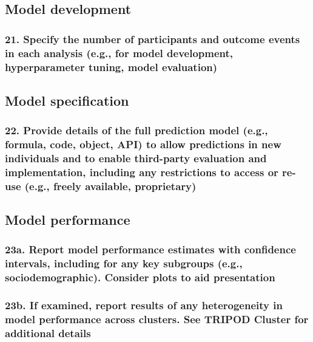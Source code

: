 \documentclass[
  letterpaper,
  DIV=11,
  numbers=noendperiod]{scrartcl}
\begin{document}
\subsection{Model development}\label{model-development}

\subsubsection{21. Specify the number of participants and outcome events
in each analysis (e.g., for model development, hyperparameter tuning,
model
evaluation)}\label{specify-the-number-of-participants-and-outcome-events-in-each-analysis-e.g.-for-model-development-hyperparameter-tuning-model-evaluation}

\subsection{Model specification}\label{model-specification}

\subsubsection{22. Provide details of the full prediction model (e.g.,
formula, code, object, API) to allow predictions in new individuals and
to enable third-party evaluation and implementation, including any
restrictions to access or re-use (e.g., freely available,
proprietary)}\label{provide-details-of-the-full-prediction-model-e.g.-formula-code-object-api-to-allow-predictions-in-new-individuals-and-to-enable-third-party-evaluation-and-implementation-including-any-restrictions-to-access-or-re-use-e.g.-freely-available-proprietary}

\subsection{Model performance}\label{model-performance}

\subsubsection{23a. Report model performance estimates with confidence
intervals, including for any key subgroups (e.g., sociodemographic).
Consider plots to aid
presentation}\label{a.-report-model-performance-estimates-with-confidence-intervals-including-for-any-key-subgroups-e.g.-sociodemographic.-consider-plots-to-aid-presentation}

\subsubsection{23b. If examined, report results of any heterogeneity in
model performance across clusters. See TRIPOD Cluster for additional
details}\label{b.-if-examined-report-results-of-any-heterogeneity-in-model-performance-across-clusters.-see-tripod-cluster-for-additional-details}
\end{document}
